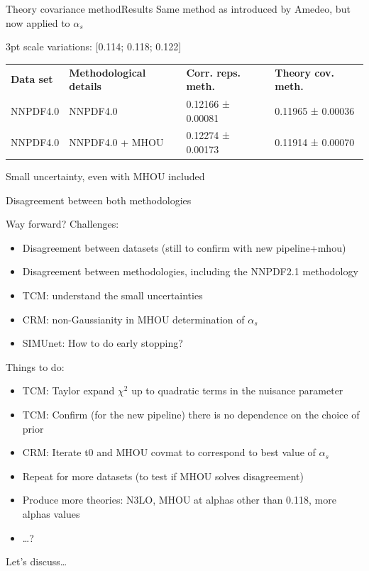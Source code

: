 \documentclass[aspectratio=169, 8pt,t]{beamer}
\begin{document}
\begin{frame}{Theory covariance method}{Results}
  Same method as introduced by Amedeo, but now applied to $\alpha_s$

  \vspace*{0.5em}
  3pt scale variations: [0.114; 0.118; 0.122]

  \vspace*{2em}

  \begin{table}[]
    \begin{tabular}{llll}
    \textbf{Data set} & \textbf{Methodological details} & \textbf{Corr. reps. meth.} & \textbf{Theory cov. meth.}       \\
    NNPDF4.0          & NNPDF4.0                        & 0.12166 ± 0.00081          & {0.11965 ± 0.00036} \\
    NNPDF4.0          & NNPDF4.0 + MHOU                 & 0.12274 ± 0.00173          & {0.11914 ± 0.00070}
    \end{tabular}
  \end{table}

  \vspace*{1em}
  Small uncertainty, even with MHOU included

  \vspace*{0.5em}
  Disagreement between both methodologies

\end{frame}



\begin{frame}{Way forward?}
  Challenges:
  \begin{itemize}
    \item Disagreement between datasets (still to confirm with new pipeline+mhou)
    \item Disagreement between methodologies, including the NNPDF2.1 methodology
    \item TCM: understand the small uncertainties
    \item CRM: non-Gaussianity in MHOU determination of $\alpha_s$
    \item SIMUnet: How to do early stopping?
  \end{itemize}

  Things to do:
  \begin{itemize}
    \item TCM: Taylor expand $\chi^2$ up to quadratic terms in the nuisance parameter
    \item TCM: Confirm (for the new pipeline) there is no dependence on the choice of prior
    \item CRM: Iterate t0 and MHOU covmat to correspond to best value of $\alpha_s$
    \item Repeat for more datasets (to test if MHOU solves disagreement)
    \item Produce more theories: N3LO, MHOU at alphas other than 0.118, more alphas values
    \item \ldots?
  \end{itemize}

  Let's discuss\ldots
\end{frame}
\end{document}
